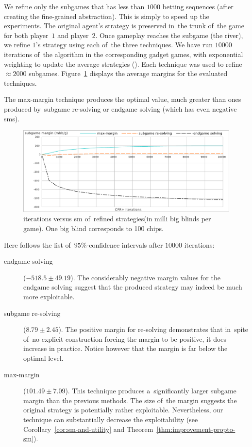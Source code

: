 We refine only the subgames that has less than $1000$ betting sequences (after creating the fine-grained abstraction).
This is simply to speed up the experiments.
The original agent's strategy is preserved in~the trunk of~the game for both player~$1$ and player~$2$.
Once gameplay reaches the subgame (the river), we refine $1$'s strategy using each of~the three techniques.
We have run $10000$ iterations of~the \cfrplus algorithm in the corresponding gadget games, with exponential weighting to update the average strategies (\cite{Tammelin2015solving}).
Each technique was used to refine $\approx 2000$ subgames.
Figure~\ref{fig:sm-experiments} displays the average margins for the evaluated techniques.

The max-margin technique produces the optimal value, much greater than ones produced by~subgame re-solving or endgame solving (which has even negative \acrlong{sm}s).

\begin{figure}[H]
  \centering
  \includegraphics[width=\textwidth]{../img/sm-experiments}
  \def\captionTitle{\cfrplus iterations versus \acrshort{sm} of~refined strategies}
  \caption[\captionTitle]{\captionTitle (in milli big blinds per game).
    One big blind corresponds to 100 chips.
  }
  \label{fig:sm-experiments}
\end{figure}

Here follows the list of~$95\%$-confidence intervals after $10000$ iterations:
\begin{description}
  \item[endgame solving] ($-518.5 \pm 49.19$).
    The considerably negative margin values for the endgame solving suggest that the produced strategy may indeed be much more exploitable.

  \item[subgame re-solving] ($8.79 \pm 2.45$).
    The positive margin for re-solving demonstrates that in~spite of~no explicit construction forcing the margin to be positive, it does increase in practice. 
    Notice however that the margin is far below the optimal level.

  \item[max-margin] ($101.49 \pm 7.09$).
    This technique produces a~significantly larger subgame margin than the previous methods.
    The size of~the margin suggests the original strategy is potentially rather exploitable.
    Nevertheless, our technique can substantially decrease the exploitability (see Corollary~\ref{cor:sm-and-utility} and Theorem~\ref{thm:improvement-propto-sm}).
\end{description}
